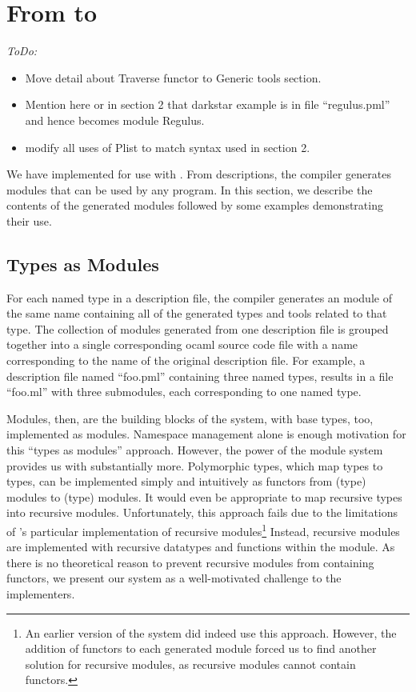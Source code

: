 \section{From \padsmlbig{} to \ocamlbig{}}
\label{sec:padsml-impl}

{\em
ToDo: 
\begin{itemize}
\item Move detail about Traverse functor to Generic tools section.
\item Mention here or in section 2 that darkstar example is in file
  ``regulus.pml'' and hence becomes module Regulus.
\item modify all uses of Plist to match syntax used in section 2.
\end{itemize}
}

We have implemented \padsml{} for use with \ocaml{}. From
descriptions, the \padsml{} compiler generates \ocaml{} modules that
can be used by any \ocaml{} program. In this section, we describe the
contents of the generated modules followed by some examples
demonstrating their use.


\subsection{Types as Modules}
\label{sec:gen-code}

For each named type in a description file, the \padsml{} compiler
generates an \ocaml{} module of the same name containing all of the
generated types and tools related to that type. The
collection of modules generated from one description file is grouped
together into a single corresponding ocaml source code file with a
name corresponding to the name of the original description file. For
example, a description file named ``foo.pml'' containing three named
types, results in a file ``foo.ml'' with three submodules, each
corresponding to one named type.

Modules, then, are the building blocks of the \padsml{} system, with
base types, too, implemented as modules. Namespace management alone is
enough motivation for this ``types as modules'' approach. However, the
power of the \ml{} module system provides us with substantially more.
Polymorphic types, which map types to types, can be implemented simply
and intuitively as functors from (type) modules to (type) modules. It
would even be appropriate to map recursive types into recursive
modules. Unfortunately, this approach fails due to the limitations of
\ocaml{}'s particular implementation of recursive modules\footnote{An
  earlier version of the system did indeed use this approach. However,
  the addition of functors to each generated module forced us to find
  another solution for recursive modules, as \ocaml{} recursive
  modules cannot contain functors.} Instead, recursive modules are
implemented with recursive datatypes and functions within the module.
As there is no theoretical reason to prevent recursive modules from
containing functors\cite{???}, we present our system as a
well-motivated challenge to the \ocaml{} implementers.

